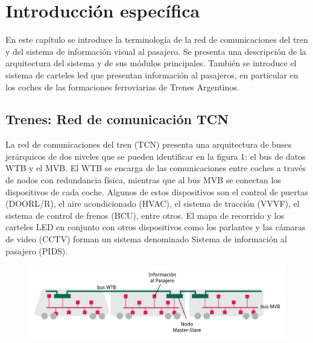 \chapter{Introducción específica} %

\label{Chapter2}

En este capítulo se introduce la terminología de la red de comunicaciones del tren y del sistema de información visual al pasajero. Se presenta una descripción de la arquitectura del sistema y de sus módulos principales. También se introduce el sistema de carteles led que presentan información al pasajeros, en particular en los coches de las formaciones ferroviarias de Trenes Argentinos.\\



\section{Trenes: Red de comunicación TCN}

La red de comunicaciones del tren (TCN) presenta una arquitectura de buses jerárquicos de dos niveles que se pueden identificar en la figura 1: el bus de datos WTB y el MVB\cite{IEC-61375-1999}. El WTB se encarga de las comunicaciones entre coches a través de nodos con redundancia física, mientras que al bus MVB se conectan los dispositivos de cada coche. Algunos de estos dispositivos son el control de puertas (DOORL/R), el aire acondicionado (HVAC), el sistema de tracción (VVVF), el sistema de control de frenos (BCU), entre otros. El mapa de recorrido y los carteles LED en conjunto con otros dispositivos como los parlantes y las cámaras de video (CCTV) forman un sistema denominado Sistema de información al pasajero (PIDS).



\begin{figure}[ht]
	\centering
	\includegraphics[width=1\textwidth]{./Figures/diagramaRedTCN.png}
	\caption{}
	\label{fig:redTCN}
\end{figure}


